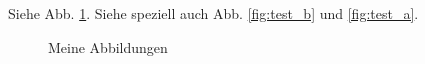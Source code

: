 \documentclass{article}
\begin{document}
Siehe Abb. \ref{fig:test}.
Siehe speziell auch Abb. \ref{fig:test_b} und \ref{fig:test_a}.

\begin{figure}
         \centering
         \caption{Meine Abbildungen}
         \label{fig:test}
\end{figure}
\end{document}
